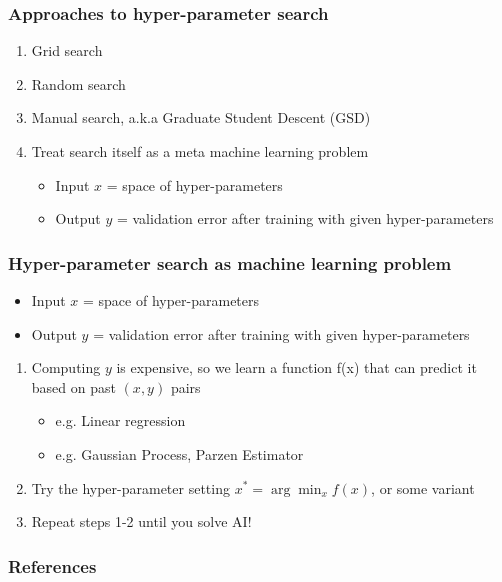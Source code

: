 \documentclass{beamer}
\newcommand{\bi}{\begin{itemize}}
\newcommand{\ei}{\end{itemize}}
\newcommand{\be}{\begin{enumerate}}
\newcommand{\ee}{\end{enumerate}}
\begin{document}
\begin{frame}
\frametitle{Approaches to hyper-parameter search}
\be
\item Grid search
\pause
\item Random search
\pause
\item Manual search, a.k.a Graduate Student Descent (GSD)
\pause
\item Treat search itself as a meta machine learning problem \cite{bergstra11hyperparam} 
\bi
	\item Input $x$ = space of hyper-parameters
	\item Output $y$ = validation error after training with given hyper-parameters
\ei
\ee 
\end{frame}

\begin{frame}
\frametitle{Hyper-parameter search as machine learning problem}
\bi
\item Input $x$ = space of hyper-parameters
\item Output $y$ = validation error after training with given hyper-parameters
\ei
\be
\item Computing $y$ is expensive, so we learn a function f(x) that can predict it based on past $(x,y)$ pairs
	\bi
	\item e.g. Linear regression
	\item e.g. Gaussian Process, Parzen Estimator \cite{bergstra11hyperparam}
	\ei
\pause
\item Try the hyper-parameter setting $x^{*} = \arg\min_x f(x)$, or some variant 
\pause
\item Repeat steps 1-2 until you solve AI!
\ee
\end{frame}
	
\begin{frame}[allowframebreaks]
\frametitle{References}


\end{frame}
\end{document}
